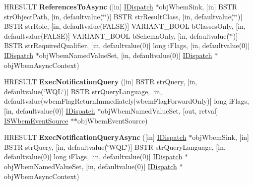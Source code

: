 \begin{DoxyCompactItemize}
H\+R\+E\+S\+U\+LT {\bfseries References\+To\+Async} (\mbox{[}in\mbox{]} \hyperlink{interface_i_dispatch}{I\+Dispatch} $\ast$obj\+Wbem\+Sink, \mbox{[}in\mbox{]} B\+S\+TR str\+Object\+Path, \mbox{[}in, defaultvalue(\char`\"{}\char`\"{})\mbox{]} B\+S\+TR str\+Result\+Class, \mbox{[}in, defaultvalue(\char`\"{}\char`\"{})\mbox{]} B\+S\+TR str\+Role, \mbox{[}in, defaultvalue(F\+A\+L\+SE)\mbox{]} V\+A\+R\+I\+A\+N\+T\+\_\+\+B\+O\+OL b\+Classes\+Only, \mbox{[}in, defaultvalue(F\+A\+L\+SE)\mbox{]} V\+A\+R\+I\+A\+N\+T\+\_\+\+B\+O\+OL b\+Schema\+Only, \mbox{[}in, defaultvalue(\char`\"{}\char`\"{})\mbox{]} B\+S\+TR str\+Required\+Qualifier, \mbox{[}in, defaultvalue(0)\mbox{]} long i\+Flags, \mbox{[}in, defaultvalue(0)\mbox{]} \hyperlink{interface_i_dispatch}{I\+Dispatch} $\ast$obj\+Wbem\+Named\+Value\+Set, \mbox{[}in, defaultvalue(0)\mbox{]} \hyperlink{interface_i_dispatch}{I\+Dispatch} $\ast$obj\+Wbem\+Async\+Context)
\item 
\mbox{\label{interface_wbem_scripting_1_1_i_s_wbem_services_acd9b02b6e9be9d1c120c022e7634d81d}} 
H\+R\+E\+S\+U\+LT {\bfseries Exec\+Notification\+Query} (\mbox{[}in\mbox{]} B\+S\+TR str\+Query, \mbox{[}in, defaultvalue(\char`\"{}W\+QL\char`\"{})\mbox{]} B\+S\+TR str\+Query\+Language, \mbox{[}in, defaultvalue(wbem\+Flag\+Return\+Immediately$\vert$wbem\+Flag\+Forward\+Only)\mbox{]} long i\+Flags, \mbox{[}in, defaultvalue(0)\mbox{]} \hyperlink{interface_i_dispatch}{I\+Dispatch} $\ast$obj\+Wbem\+Named\+Value\+Set, \mbox{[}out, retval\mbox{]} \hyperlink{interface_wbem_scripting_1_1_i_s_wbem_event_source}{I\+S\+Wbem\+Event\+Source} $\ast$$\ast$obj\+Wbem\+Event\+Source)
\item 
\mbox{\label{interface_wbem_scripting_1_1_i_s_wbem_services_ab8b2481134db5dd47623361d98b992f7}} 
H\+R\+E\+S\+U\+LT {\bfseries Exec\+Notification\+Query\+Async} (\mbox{[}in\mbox{]} \hyperlink{interface_i_dispatch}{I\+Dispatch} $\ast$obj\+Wbem\+Sink, \mbox{[}in\mbox{]} B\+S\+TR str\+Query, \mbox{[}in, defaultvalue(\char`\"{}W\+QL\char`\"{})\mbox{]} B\+S\+TR str\+Query\+Language, \mbox{[}in, defaultvalue(0)\mbox{]} long i\+Flags, \mbox{[}in, defaultvalue(0)\mbox{]} \hyperlink{interface_i_dispatch}{I\+Dispatch} $\ast$obj\+Wbem\+Named\+Value\+Set, \mbox{[}in, defaultvalue(0)\mbox{]} \hyperlink{interface_i_dispatch}{I\+Dispatch} $\ast$obj\+Wbem\+Async\+Context)
\item 
\mbox{\label{interface_wbem_scripting_1_1_i_s_wbem_services_af6d80546c5ed3203d496f224a3cead5a}} 
$$
\end{DoxyCompactItemize}
